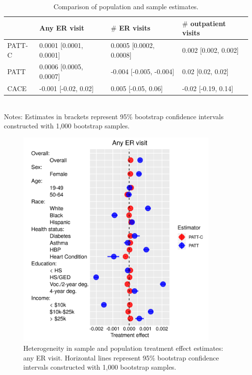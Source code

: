 \documentclass[hidelinks,12pt]{article}
\begin{document}
\begin{appendices}
\begin{table}[h]
	\caption{Comparison of population and sample estimates.\label{compliance-compare}} 
	\begin{tabular}{@{}llll@{}}
		\toprule
		\backslashbox{Estimator}{Outcome} 				& Any ER visit 	& $\#$ ER visits   & $\#$ outpatient visits      \\ \midrule
		PATT-C                                           & 0.0001 [0.0001, 0.0001]   & 0.0005 [0.0002, 0.0008]	& 0.002 [0.002, 0.002] \\
		PATT                                             & 0.0006 [0.0005, 0.0007]   & -0.004 [-0.005, -0.004]	& 0.02 [0.02, 0.02]  \\
		CACE                                             & -0.001 [-0.02, 0.02]   & 0.005 [-0.05, 0.06]	& -0.02 [-0.19, 0.14]  \\ \bottomrule
	\end{tabular}\\
	\footnotesize{Notes: Estimates in brackets represent 95\% bootstrap confidence intervals constructed with 1,000 bootstrap samples.}
\end{table}

\begin{figure}[htbp]
	\begin{center}
		\includegraphics[width = 0.9\textwidth]{any-visit-plot.png}
		\caption{Heterogeneity in sample and population treatment effect estimates: any ER visit. Horizontal lines represent 95\% bootstrap confidence intervals constructed with 1,000 bootstrap samples.\label{fig:any-visit-plot}}
	\end{center}
\end{figure}



\end{appendices}
\end{document}
